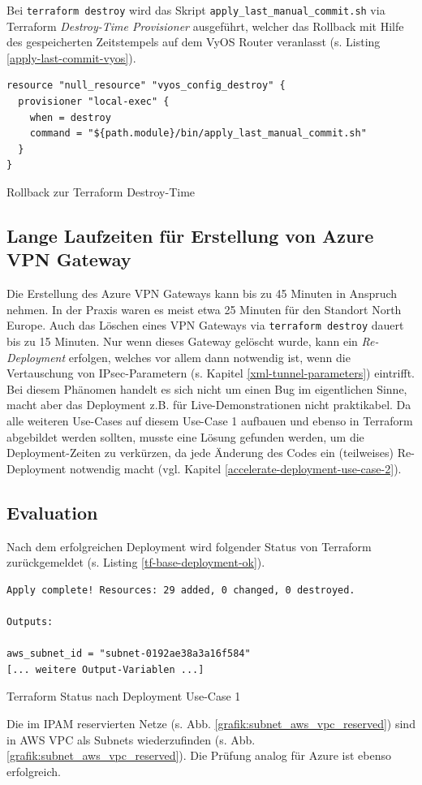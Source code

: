 Bei \texttt{terraform destroy} wird das Skript \texttt{apply\_last\_manual\_commit.sh} via Terraform \textit{Destroy-Time Provisioner} ausgeführt, welcher das \gls{Rollback} mit Hilfe des gespeicherten Zeitstempels auf dem VyOS Router veranlasst (s. Listing \ref{apply-last-commit-vyos}).
\begin{listing}[h]
\begin{verbatim}
resource "null_resource" "vyos_config_destroy" {
  provisioner "local-exec" {
    when = destroy
    command = "${path.module}/bin/apply_last_manual_commit.sh"
  }
}

\end{verbatim}
\caption{\gls{Rollback} zur Terraform \glqq Destroy-Time\grqq{}}
\label{apply-last-commit-vyos}
\end{listing}\FloatBarrier
\subsection{Lange Laufzeiten für Erstellung von Azure VPN Gateway}\label{azure-deployment-time}
Die Erstellung des Azure VPN Gateways kann bis zu 45 Minuten in Anspruch nehmen\cite{azurevpndeployment2021}. In der Praxis waren es meist etwa 25 Minuten für den Standort \glqq North Europe\grqq{}. Auch das Löschen eines VPN Gateways via \texttt{terraform destroy} dauert bis zu 15 Minuten. Nur wenn dieses Gateway gelöscht wurde, kann ein \textit{Re-\gls{Deployment}} erfolgen, welches vor allem dann notwendig ist, wenn die Vertauschung von IPsec-Parametern (s. Kapitel \ref{xml-tunnel-parameters}) eintrifft.\\
Bei diesem Phänomen handelt es sich nicht um einen Bug im eigentlichen Sinne, macht aber das \gls{Deployment} z.B. für Live-Demonstrationen nicht praktikabel. Da alle weiteren Use-Cases auf diesem Use-Case 1 aufbauen und ebenso in Terraform abgebildet werden sollten, musste eine Lösung gefunden werden, um die \gls{Deployment}-Zeiten zu verkürzen, da jede Änderung des Codes ein (teilweises) Re-\gls{Deployment} notwendig macht (vgl. Kapitel \ref{accelerate-deployment-use-case-2}).
\subsection{Evaluation}
Nach dem erfolgreichen \gls{Deployment} wird folgender Status von Terraform zurückgemeldet (s. Listing \ref{tf-base-deployment-ok}).
\begin{listing}[h]
\begin{verbatim}
Apply complete! Resources: 29 added, 0 changed, 0 destroyed.

Outputs:

aws_subnet_id = "subnet-0192ae38a3a16f584"
[... weitere Output-Variablen ...]
\end{verbatim}
\caption{Terraform Status nach \gls{Deployment} Use-Case 1}
\label{tf-base-deployment-ok}
\end{listing}\FloatBarrier
Die im IPAM reservierten Netze (s. Abb. \ref{grafik:subnet_aws_vpc_reserved}) sind in AWS VPC als Subnets wiederzufinden (s. Abb. \ref{grafik:subnet_aws_vpc_reserved}). Die Prüfung analog für Azure ist ebenso erfolgreich.

